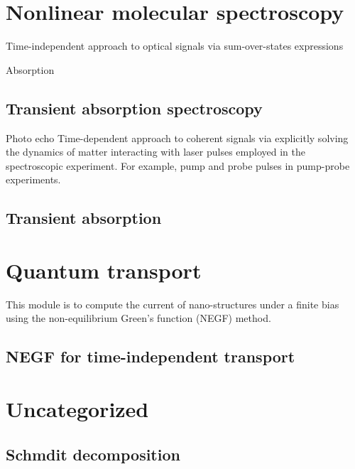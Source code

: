 \documentclass[a4paper,12pt]{book}
\begin{document}
\chapter{Nonlinear molecular spectroscopy} 
Time-independent approach to optical signals via sum-over-states expressions

Absorption
\section{Transient absorption spectroscopy} 
Photo echo
Time-dependent approach to coherent signals via explicitly solving the dynamics of matter interacting with laser pulses employed in the spectroscopic experiment. For example, pump and probe pulses in pump-probe experiments.

\section{Transient absorption} 

\chapter{ Quantum transport} 
This module is to compute the current of nano-structures under a finite bias using the non-equilibrium Green's function (NEGF) method.

\section{NEGF for time-independent transport} 


\chapter{Uncategorized}

\section{Schmdit decomposition}


\backmatter
\end{document}
